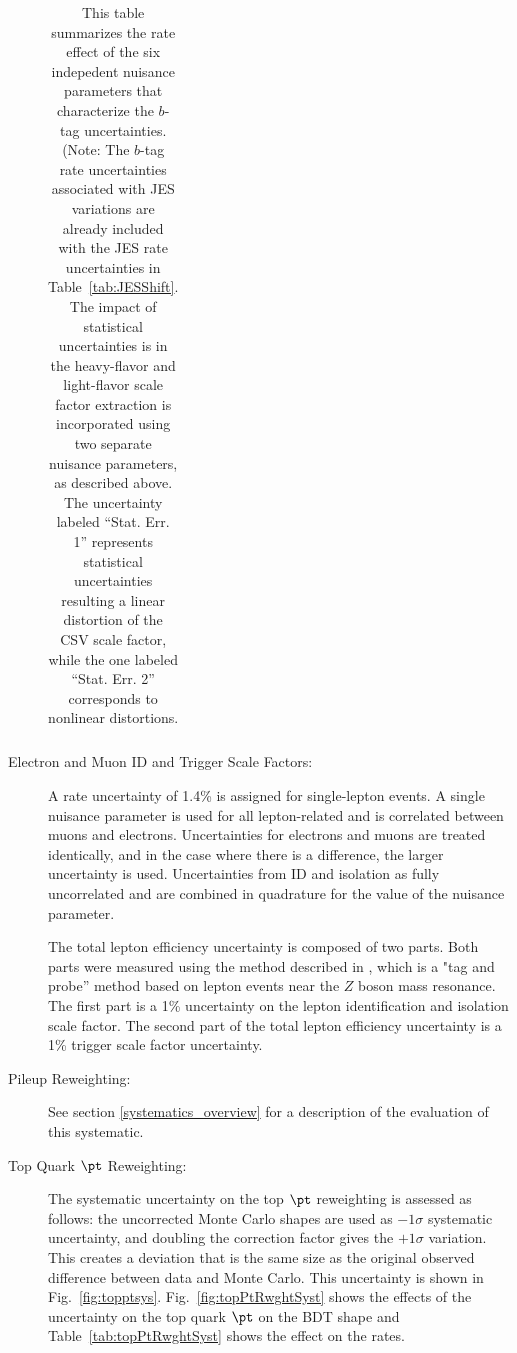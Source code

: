 \begin{description}
\begin{table}[hbtp]
\begin{tabular}{|c|c|c|c|c|}
   \end{tabular} 
   \caption{This table summarizes the rate effect of the six indepedent nuisance parameters that characterize the $b$-tag uncertainties.  (Note:  The $b$-tag rate uncertainties associated with JES variations are already included with the JES rate uncertainties in Table~\ref{tab:JESShift}.  The impact of statistical uncertainties is in the heavy-flavor and light-flavor scale factor extraction is incorporated using two separate nuisance parameters, as described above.  The uncertainty labeled ``Stat. Err. 1'' represents statistical uncertainties resulting a linear distortion of the CSV scale factor, while the one labeled ``Stat. Err. 2'' corresponds to nonlinear distortions.}
   \label{tab:CSVRates}
 \end{table} 


\item[Electron and Muon ID and Trigger Scale Factors:] A rate uncertainty of
 1.4\%  is assigned for single-lepton events. A single nuisance
 parameter is used for all lepton-related and is correlated between muons and electrons.
 Uncertainties for electrons and muons are treated identically, and in
 the case where there is a difference, the larger uncertainty is
 used.  Uncertainties from ID and isolation as fully uncorrelated and
 are combined in quadrature for the value of the nuisance
 parameter. 

  The total lepton efficiency uncertainty is composed of two
  parts. Both parts were measured using the method described in
  \cite{CMS-AN-12-389}, which is a "tag and probe'' method based on
  lepton events near the $Z$ boson mass resonance. The first part is a
  1\% uncertainty on the lepton identification and isolation scale
  factor. The second part of the total lepton efficiency uncertainty
  is a 1\% trigger scale factor uncertainty. 

  \item[Pileup Reweighting:]  See section \ref{systematics_overview}
  for a description of the evaluation of this systematic.  

\item[Top Quark $\pt$ Reweighting:] The systematic uncertainty on the
  top $\pt$ reweighting is assessed as follows: the uncorrected
  Monte Carlo shapes are used as $-1\sigma$ systematic uncertainty,
  and doubling the correction factor gives the $+1\sigma$ variation.
  This creates a deviation that is the same size as the original
  observed difference between data and Monte Carlo.  This uncertainty
  is shown in Fig.~\ref{fig:topptsys}.  Fig.~\ref{fig:topPtRwghtSyst}
  shows the effects of the uncertainty on the top quark $\pt$ on the
  BDT shape and Table~\ref{tab:topPtRwghtSyst} shows the effect on the rates.


\end{description}
